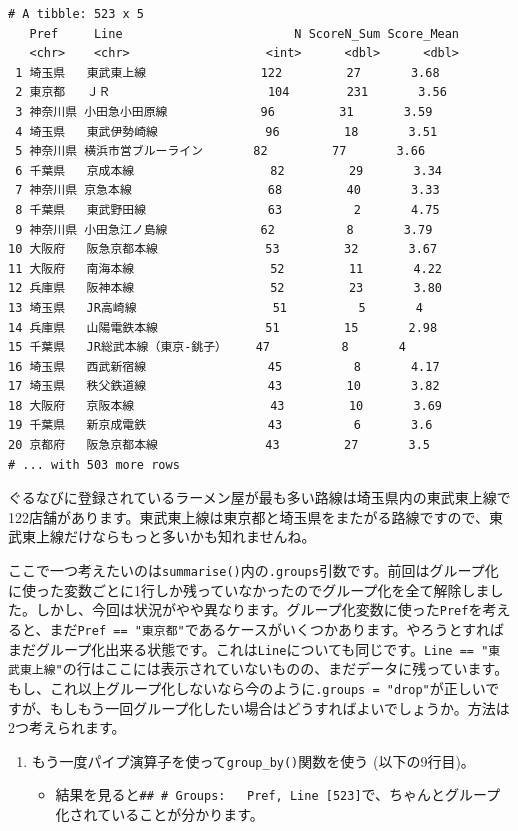 \documentclass[
  a4paper,
  pandoc,
  ja=standard,
  jafont=haranoaji]{bxjsbook}
\providecommand{\tightlist}{%
  \setlength{\itemsep}{0pt}\setlength{\parskip}{0pt}}
\begin{document}
\begin{verbatim}
# A tibble: 523 x 5
   Pref     Line                        N ScoreN_Sum Score_Mean
   <chr>    <chr>                   <int>      <dbl>      <dbl>
 1 埼玉県   東武東上線                122         27       3.68
 2 東京都   ＪＲ                      104        231       3.56
 3 神奈川県 小田急小田原線             96         31       3.59
 4 埼玉県   東武伊勢崎線               96         18       3.51
 5 神奈川県 横浜市営ブルーライン       82         77       3.66
 6 千葉県   京成本線                   82         29       3.34
 7 神奈川県 京急本線                   68         40       3.33
 8 千葉県   東武野田線                 63          2       4.75
 9 神奈川県 小田急江ノ島線             62          8       3.79
10 大阪府   阪急京都本線               53         32       3.67
11 大阪府   南海本線                   52         11       4.22
12 兵庫県   阪神本線                   52         23       3.80
13 埼玉県   JR高崎線                   51          5       4   
14 兵庫県   山陽電鉄本線               51         15       2.98
15 千葉県   JR総武本線（東京-銚子）    47          8       4   
16 埼玉県   西武新宿線                 45          8       4.17
17 埼玉県   秩父鉄道線                 43         10       3.82
18 大阪府   京阪本線                   43         10       3.69
19 千葉県   新京成電鉄                 43          6       3.6 
20 京都府   阪急京都本線               43         27       3.5 
# ... with 503 more rows
\end{verbatim}

ぐるなびに登録されているラーメン屋が最も多い路線は埼玉県内の東武東上線で122店舗があります。東武東上線は東京都と埼玉県をまたがる路線ですので、東武東上線だけならもっと多いかも知れませんね。

ここで一つ考えたいのは\texttt{summarise()}内の\texttt{.groups}引数です。前回はグループ化に使った変数ごとに1行しか残っていなかったのでグループ化を全て解除しました。しかし、今回は状況がやや異なります。グループ化変数に使った\texttt{Pref}を考えると、まだ\texttt{Pref\ ==\ "東京都"}であるケースがいくつかあります。やろうとすればまだグループ化出来る状態です。これは\texttt{Line}についても同じです。\texttt{Line\ ==\ "東武東上線"}の行はここには表示されていないものの、まだデータに残っています。もし、これ以上グループ化しないなら今のように\texttt{.groups\ =\ "drop"}が正しいですが、もしもう一回グループ化したい場合はどうすればよいでしょうか。方法は2つ考えられます。

\begin{enumerate}
\def\labelenumi{\arabic{enumi}.}
\tightlist
\item
  もう一度パイプ演算子を使って\texttt{group\_by()}関数を使う
  (以下の9行目)。

  \begin{itemize}
  \tightlist
  \item
    結果を見ると\texttt{\#\#\ \#\ Groups:\ \ \ Pref,\ Line\ {[}523{]}}で、ちゃんとグループ化されていることが分かります。
  \end{itemize}
\end{enumerate}
\end{document}

